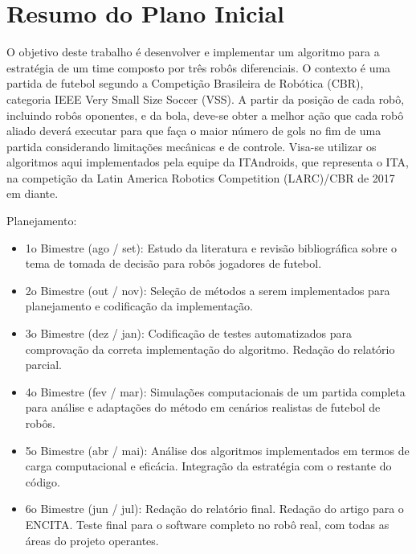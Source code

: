 \documentclass[a4paper,12pt]{article}
\begin{document}




\tableofcontents

\newpage

\section{Resumo do Plano Inicial}
\label{secao:plano_inicial}

O objetivo deste trabalho é desenvolver e implementar um algoritmo para a estratégia de um time composto por três robôs diferenciais. O contexto é uma partida de futebol segundo a Competição Brasileira de Robótica (CBR), categoria IEEE Very Small Size Soccer (VSS). A partir da posição de cada robô, incluindo robôs oponentes, e da bola, deve-se obter a melhor ação que cada robô aliado deverá executar para que faça o maior número de gols no fim de uma partida considerando limitações mecânicas e de controle. Visa-se utilizar os algoritmos aqui implementados pela equipe da ITAndroids, que representa o ITA, na competição da Latin America Robotics Competition (LARC)/CBR de 2017 em diante.

Planejamento:
\begin{itemize}

\item 1o Bimestre (ago / set): Estudo da literatura e revisão bibliográfica sobre o tema de tomada de decisão para robôs jogadores de futebol.

\item 2o Bimestre (out / nov): Seleção de métodos a serem implementados para planejamento e codificação da implementação.

\item 3o Bimestre (dez / jan): Codificação de testes automatizados para comprovação da correta implementação do algoritmo. Redação do relatório parcial.

\item 4o Bimestre (fev / mar): Simulações computacionais de um partida completa para análise e adaptações do método em cenários realistas de futebol de robôs.

\item 5o Bimestre (abr / mai): Análise dos algoritmos implementados em termos de carga computacional e eficácia. Integração da estratégia com o restante do código.

\item 6o Bimestre (jun / jul): Redação do relatório final. Redação do artigo para o ENCITA. Teste final para o software completo no robô real, com todas as áreas do projeto operantes.

\end{itemize}
\end{document}
